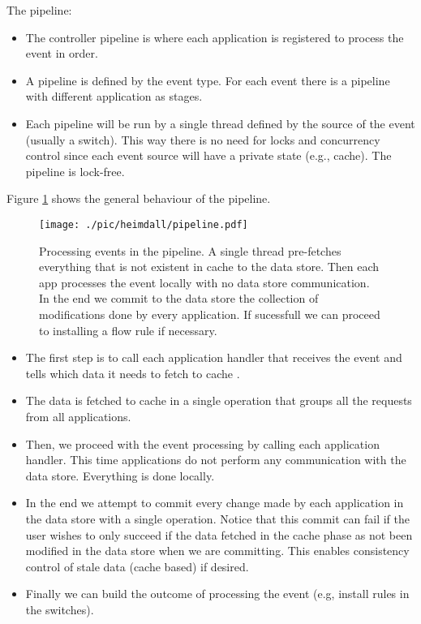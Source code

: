 The pipeline: 
\begin{itemize}
\item The controller pipeline is where each application is registered to process the event in order. 
\item A pipeline is defined by the event type. For each event there is a  pipeline with different application as stages. 
\item Each pipeline will be run by a single thread  defined by the source of the event (usually a switch). This way there is no need for locks and concurrency control since each event source will have a private state (e.g., cache). The pipeline is lock-free. 
\end{itemize}

Figure \ref{fig:pipeline} shows the general behaviour of the pipeline. 


\begin{figure}[ht]
  \centering
  \texttt{[image: ./pic/heimdall/pipeline.pdf]}
  \caption{Processing events in the pipeline. A single thread pre-fetches everything that is not existent in cache to the data store. Then each app processes the event locally with no data store communication. In the end we commit to the data store the collection of modifications done by every application. If sucessfull we can proceed to installing a flow rule if necessary. }
\label{fig:pipeline}
\end{figure}


\begin{itemize}
\item The first step is to call each application handler that receives the event and  tells which data it needs to fetch to cache . 
\item The data is fetched to cache in a single operation that groups all the requests from all applications. 
\item Then, we proceed with the event processing by calling each application handler. This time applications do not perform any communication with the data store. Everything is done locally. 
\item In the end we attempt to commit every change made by each application in the data store with a single operation. Notice that this commit can fail if the user wishes to only succeed if the data fetched in the cache phase as not been modified in the data store when we are committing. This enables consistency control of stale data (cache based) if desired. 
\item Finally we can build the outcome of processing the event (e.g, install rules in the switches). 
\end{itemize}

